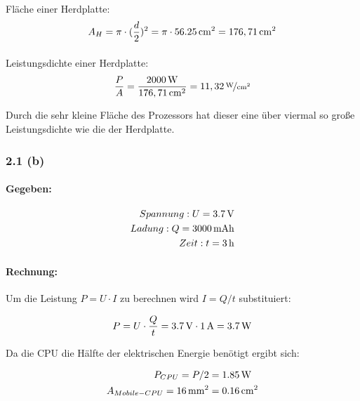 \documentclass[11pt,a4paper]{article}
\begin{document}
\paragraph{}Fläche einer Herdplatte:
\begin{equation*}
A_H = \pi\cdot(\frac{d}{2})^2 =  \pi\cdot\unit[56.25]{cm^2} = \unit[176,71]{cm^2}
\end{equation*}

\paragraph{}Leistungsdichte einer Herdplatte:
\begin{equation*}
\frac{P}{A} = \frac{\unit[2000]{W}}{\unit[176,71]{cm^2}} = \unitfrac[11,32]{W}{cm^2}
\end{equation*}

Durch die sehr kleine Fläche des Prozessors hat dieser eine über viermal so große Leistungsdichte wie die der Herdplatte.

\newpage
\subsubsection{2.1 (b)}
\paragraph{Gegeben:}
\begin{align*}
Spannung: U = \unit[3.7]{V}\\
Ladung: Q = \unit[3000]{mAh}\\
Zeit: t = \unit[3]{h}
\end{align*}

\paragraph{Rechnung:}
Um die Leistung $P = U \cdot I$ zu berechnen wird $I = Q/t$ substituiert:

\begin{equation*}
P = U\cdot\frac{Q}{t} = \unit[3.7]{V} \cdot \unit[1]{A} = \unit[3.7]{W}
\end{equation*}

Da die CPU die Hälfte der elektrischen Energie benötigt ergibt sich:

\begin{align*}
P_{CPU} = P/2 &= \unit[1.85]{W}\\
A_{Mobile-CPU} = \unit[16]{mm^2} &= \unit[0.16]{cm^2}
\end{align*}
\end{document}
